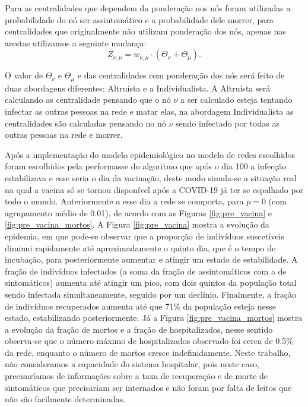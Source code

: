 Para as centralidades que dependem da ponderação nos nós foram utilizadas a probabilidade do nó ser assintomático e a probabilidade dele morrer, para centralidades que originalmente não utilizam ponderação dos nós, apenas nas arestas utilizamos a seguinte mudança:
\begin{equation}
    Z_{\nu,\mu} = w_{\nu,\mu}\cdot(\Theta_\nu + \Theta_\mu).
\end{equation}

O valor de $\Theta_\nu$ e $\Theta_\mu$ e das centralidades com ponderação dos nós será feito de duas abordagens diferentes: Altruísta e a Individualista. A Altruísta será calculando as centralidade pensando que o nó $\nu$ a ser calculado esteja tentando infectar as outras pessoas na rede e matar elas, na abordagem Individualista as centralidades são calculadas pensando no nó $\nu$ sendo infectado por todas as outras pessoas na rede e morrer.

Após a implementação do modelo epidemiológico no modelo de redes escolhidos foram escolhidos pela performasse do algoritmo que após o dia 100 a infecção estabilizava e esse seria o dia da vacinação, deste modo simula-se a situação real na qual a vacina só se tornou disponível após a COVID-19 já ter se espalhado por todo o mundo. Anteriormente a esse dia a rede se comporta, para $p = 0$ (com agrupamento médio de 0.01), de acordo com as Figuras \ref{fig:pre_vacina} e \ref{fig:pre_vacina_mortos}. A Figura \ref{fig:pre_vacina} mostra a evolução da epidemia, em que pode-se observar que a proporção de indivíduos suscetíveis diminui rapidamente até aproximadamente o quinto dia, que é o tempo de incubação, para posteriormente aumentar e atingir um estado de estabilidade. A fração de indivíduos infectados (a soma da fração de assintomáticos com a de sintomáticos) aumenta até atingir um pico, com  dois quintos da população total sendo infectada simultaneamente, seguido por um declínio. Finalmente, a fração de indivíduos recuperados aumenta até que 71\% da população esteja nesse estado, estabilizando posteriormente. Já a Figura \ref{fig:pre_vacina_mortos} mostra a evolução  da  fração de mortos e a fração de hospitalizados, nesse sentido observa-se que o número máximo de hospitalizados observado foi cerca de 0.5\% da rede, enquanto o número de mortos cresce indefinidamente. Neste trabalho, não consideramos a capacidade do sistema hospitalar, pois neste caso, precisaríamos de informações sobre a taxa de recuperação e de morte de sintomáticos que precisariam ser internados e não foram por falta de leitos que não são facilmente determinadas.   

